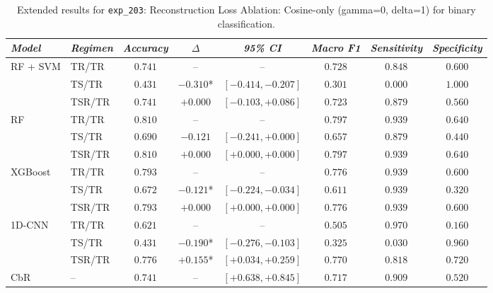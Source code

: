 \begin{table}[H]
\centering
\scriptsize
\caption{Extended results for \texttt{exp\_203}: Reconstruction Loss Ablation: Cosine-only (gamma=0, delta=1) for binary classification.}
\label{tab:appendix_exp_203}
\begin{tabular*}{\textwidth}{@{\extracolsep{\fill}}llcccccc}
\toprule
\emph{Model} & \emph{Regimen} & \emph{Accuracy} & \emph{$\Delta$} & \emph{95\% CI} & \emph{Macro F1} & \emph{Sensitivity} & \emph{Specificity}\\
\midrule
\multirow{3}{*}{RF + SVM} & TR/TR & $0.741$ & -- & -- & $0.728$ & $0.848$ & $0.600$\\
 & TS/TR & $0.431$ & $-0.310$* & $[-0.414, -0.207]$ & $0.301$ & $0.000$ & $1.000$\\
 & TSR/TR & $0.741$ & $+0.000$ & $[-0.103, +0.086]$ & $0.723$ & $0.879$ & $0.560$\\
\midrule
\multirow{3}{*}{RF} & TR/TR & $0.810$ & -- & -- & $0.797$ & $0.939$ & $0.640$\\
 & TS/TR & $0.690$ & $-0.121$ & $[-0.241, +0.000]$ & $0.657$ & $0.879$ & $0.440$\\
 & TSR/TR & $0.810$ & $+0.000$ & $[+0.000, +0.000]$ & $0.797$ & $0.939$ & $0.640$\\
\midrule
\multirow{3}{*}{XGBoost} & TR/TR & $0.793$ & -- & -- & $0.776$ & $0.939$ & $0.600$\\
 & TS/TR & $0.672$ & $-0.121$* & $[-0.224, -0.034]$ & $0.611$ & $0.939$ & $0.320$\\
 & TSR/TR & $0.793$ & $+0.000$ & $[+0.000, +0.000]$ & $0.776$ & $0.939$ & $0.600$\\
\midrule
\multirow{3}{*}{1D-CNN} & TR/TR & $0.621$ & -- & -- & $0.505$ & $0.970$ & $0.160$\\
 & TS/TR & $0.431$ & $-0.190$* & $[-0.276, -0.103]$ & $0.325$ & $0.030$ & $0.960$\\
 & TSR/TR & $0.776$ & $+0.155$* & $[+0.034, +0.259]$ & $0.770$ & $0.818$ & $0.720$\\
\midrule
CbR & -- & $0.741$ & -- & $[+0.638, +0.845]$ & $0.717$ & $0.909$ & $0.520$\\
\bottomrule
\end{tabular*}
\end{table}

